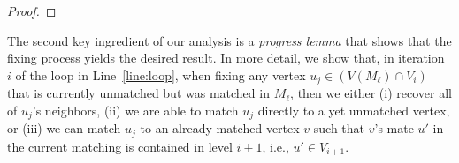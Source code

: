 \documentclass[11pt,a4paper]{article}
\begin{document}
\begin{proof}

\end{proof}

The second key ingredient of our analysis is a {\em progress lemma} that shows that the fixing process yields the desired result. In more detail, we show that, in iteration $i$ of the loop in Line~\ref{line:loop}, when fixing any vertex $u_j \in (V(M_\ell) \cap V_i)$ that is currently unmatched but was matched in $M_{\ell}$, then we either (i) recover all of $u_j$'s neighbors, (ii) we are able to match $u_j$ directly to a yet unmatched vertex, or (iii) we can match $u_j$ to an already matched vertex $v$ such that $v$'s mate $u'$ in the current matching is contained in level $i+1$, i.e., $u' \in V_{i+1}$. 
\end{document}
